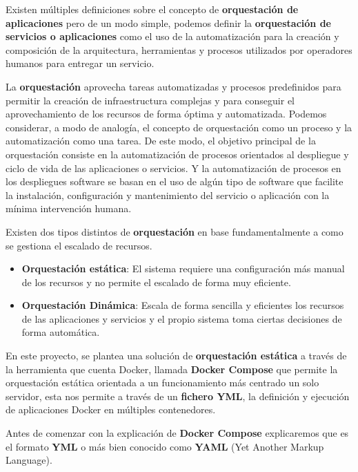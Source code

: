 Existen múltiples definiciones sobre el concepto de \textbf{orquestación de aplicaciones} pero de un modo simple, podemos definir la \textbf{orquestación de servicios o aplicaciones} como el uso de la automatización para la creación y composición de la arquitectura, herramientas y procesos utilizados por operadores humanos para entregar un servicio.

La \textbf{orquestación} aprovecha tareas automatizadas y procesos predefinidos para permitir la creación de infraestructura complejas y para conseguir el aprovechamiento de los recursos de forma óptima y automatizada. Podemos considerar, a modo de analogía, el concepto de orquestación como un
proceso y la automatización como una tarea.
\newpage
De este modo, el objetivo principal de la orquestación consiste en la automatización de procesos orientados al despliegue y ciclo de vida de las aplicaciones o servicios. Y la automatización de procesos en los despliegues software se basan en el uso de algún tipo de software que facilite la instalación, configuración y mantenimiento del servicio o aplicación con la mínima intervención humana.

Existen dos tipos distintos de \textbf{orquestación} en base fundamentalmente a como se gestiona el escalado de recursos.
\begin{itemize}
	\item \textbf{Orquestación estática}: El sistema requiere una configuración más manual de los recursos y no permite el escalado de forma muy eficiente.
	\item \textbf{Orquestación Dinámica}: Escala de forma sencilla y eficientes los recursos de las aplicaciones y servicios y el propio sistema toma ciertas decisiones de forma automática.
\end{itemize}

En este proyecto, se plantea una solución de \textbf{orquestación estática} a través de la herramienta que cuenta Docker, llamada \textbf{Docker Compose} que permite la orquestación estática orientada a un funcionamiento más centrado un solo servidor, esta nos permite a través de un \textbf{fichero YML}, la definición y ejecución de aplicaciones Docker en múltiples contenedores.

Antes de comenzar con la explicación de \textbf{Docker Compose} explicaremos que es el formato \textbf{YML} o más bien conocido como \textbf{YAML} (Yet Another Markup Language). \cite{YML}

